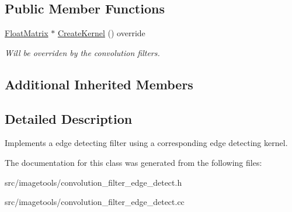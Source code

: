 \subsection*{Public Member Functions}
\begin{DoxyCompactItemize}
\item 
\mbox{\label{classimage__tools_1_1ConvolutionFilterEdgeDetect_ae2ec1313b3a53c6542ce369321ebab21}} 
\hyperlink{classimage__tools_1_1FloatMatrix}{Float\+Matrix} $\ast$ \hyperlink{classimage__tools_1_1ConvolutionFilterEdgeDetect_ae2ec1313b3a53c6542ce369321ebab21}{Create\+Kernel} () override
\begin{DoxyCompactList}\small\item\em Will be overriden by the convolution filters. \end{DoxyCompactList}\end{DoxyCompactItemize}
\subsection*{Additional Inherited Members}


\subsection{Detailed Description}
Implements a edge detecting filter using a corresponding edge detecting kernel. 

The documentation for this class was generated from the following files\+:\begin{DoxyCompactItemize}
\item 
src/imagetools/convolution\+\_\+filter\+\_\+edge\+\_\+detect.\+h\item 
src/imagetools/convolution\+\_\+filter\+\_\+edge\+\_\+detect.\+cc\end{DoxyCompactItemize}
